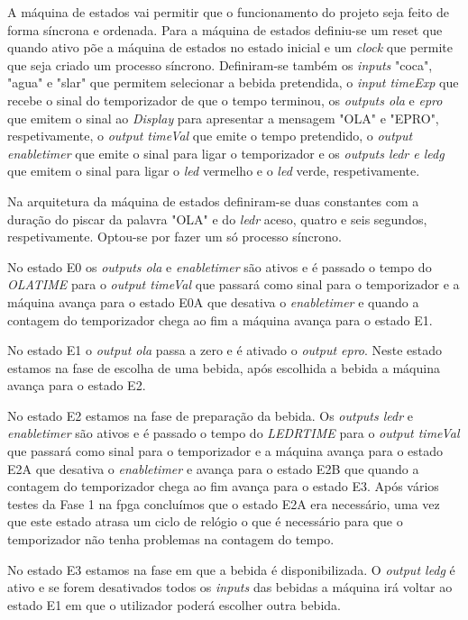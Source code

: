 \documentclass{report}
\begin{document}
A máquina de estados vai permitir que o funcionamento do projeto seja feito de forma síncrona e ordenada. Para a máquina de estados definiu-se um reset que quando ativo põe a máquina de estados no estado inicial e um \textit{clock} que permite que seja criado um processo síncrono. Definiram-se também os \textit{inputs} "coca", "agua" e "slar" que permitem selecionar a bebida pretendida, o \textit{input timeExp} que recebe o sinal do temporizador de que o tempo terminou, os \textit{outputs ola} e \textit{epro} que emitem o sinal ao \textit{Display} para apresentar a mensagem "OLA" e "EPRO", respetivamente, o \textit{output timeVal} que emite o tempo pretendido, o \textit{output enable\textunderscore timer} que emite o sinal para ligar o temporizador e os \textit{outputs ledr e ledg} que emitem o sinal para ligar o \textit{led} vermelho e o \textit{led} verde, respetivamente.

Na arquitetura da máquina de estados definiram-se duas constantes com a duração do piscar da palavra "OLA" e do \textit{ledr} aceso, quatro e seis segundos, respetivamente.
Optou-se por fazer um só processo síncrono. 

No estado E0 os \textit{outputs ola} e \textit{enable\textunderscore timer} são ativos e é passado o tempo do \textit{OLA\textunderscore TIME} para o \textit{output timeVal} que passará como sinal para o temporizador e a máquina avança para o estado E0A que desativa o \textit{enable\textunderscore timer} e quando a contagem do temporizador chega ao fim a máquina avança para o estado E1.

No estado E1 o \textit{output ola} passa a zero e é ativado o \textit{output epro}. Neste estado estamos na fase de escolha de uma bebida, após escolhida a bebida a máquina avança para o estado E2.

No estado E2 estamos na fase de preparação da bebida. Os \textit{outputs ledr} e \textit{enable\textunderscore timer} são ativos e é passado o tempo do \textit{LEDR\textunderscore TIME} para o \textit{output timeVal} que passará como sinal para o temporizador e a máquina avança para o estado E2A que desativa o \textit{enable\textunderscore timer} e avança para o estado E2B que quando a contagem do temporizador chega ao fim avança para o estado E3. Após vários testes da Fase 1 na \ac{fpga} concluímos que o estado E2A era necessário, uma vez que este estado atrasa um ciclo de relógio o que é necessário para que o temporizador não tenha problemas na contagem do tempo.

No estado E3 estamos na fase em que a bebida é disponibilizada. O \textit{output ledg} é ativo e se forem desativados todos os \textit{inputs} das bebidas a máquina irá voltar ao estado E1 em que o utilizador poderá escolher outra bebida.
\end{document}
